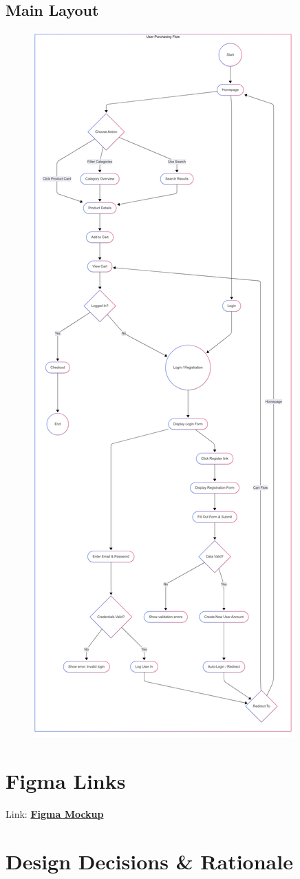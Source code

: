 \documentclass[12pt]{article}
\begin{document}
	\newpage
	\subsection{Main Layout}\label{subsec:main-layout}

	\begin{figure}[h!]
		\centering
		\includegraphics[width=0.44\linewidth]{pictures/main/UserFlow}
		\label{fig:figure18}
	\end{figure}
		\newpage

	\section{Figma Links}\label{sec:figma_linkss}

	Link: \textbf{\href{https://www.figma.com/design/7LHBUb3AS0K3xtEwSQONxH/Mockup?node-id=66-3583&t=5vuDVSEo99qMNsce-1}{Figma Mockup}}


	\section{Design Decisions \& Rationale}\label{sec:design-decisions-&-rationale}
\end{document}
